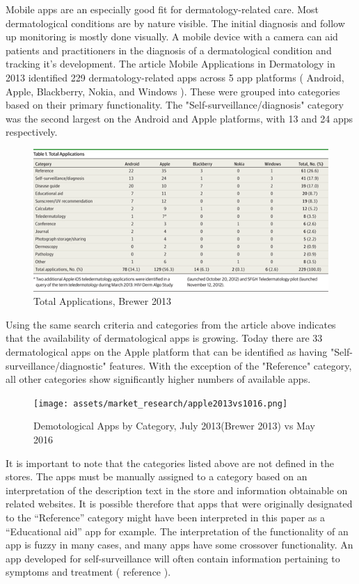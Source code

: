 Mobile apps are an especially good fit for dermatology-related care. Most dermatological conditions are by nature visible. The initial diagnosis and follow up monitoring is mostly done visually. A mobile device with a camera can aid patients and practitioners in the diagnosis of a dermatological condition and tracking it's development. The article Mobile Applications in Dermatology\cite{Brewer_2013} in 2013 identified 229 dermatology-related apps across 5 app platforms ( Android, Apple, Blackberry, Nokia, and Windows ). These were grouped into categories based on their primary functionality. The "Self-surveillance/diagnosis" category was the second largest on the Android and Apple platforms, with 13 and 24 apps respectively.

\begin{figure}[H]
    \centering
    \includegraphics[width=\textwidth]{assets/market_research/brewer.png}
    \caption{Total Applications, Brewer 2013}
    \label{fig:brewer}
\end{figure}

Using the same search criteria and categories from the article above indicates that the availability of dermatological apps is growing. Today there are 33 dermatological apps on the Apple platform that can be identified as having "Self-surveillance/diagnostic" features. With the exception of the "Reference" category, all other categories show significantly higher numbers of available apps.


\begin{figure}[H]
    \centering
    \texttt{[image: assets/market\_research/apple2013vs1016.png]}
    \caption{Demotological Apps by Category, July 2013(Brewer 2013) vs May 2016}
    \label{fig:apps_vs}
\end{figure}

It is important to note that the categories listed above are not defined in the stores. The apps must be manually assigned to a category based on an interpretation of the description text in the store and information obtainable on related websites. It is possible therefore that apps that were originally designated to the “Reference” category might have been interpreted in this paper as a “Educational aid” app for example. The interpretation of the functionality of an app is fuzzy in many cases, and many apps have some crossover functionality. An app developed for self-surveillance will often contain information pertaining to symptoms and treatment ( reference ).